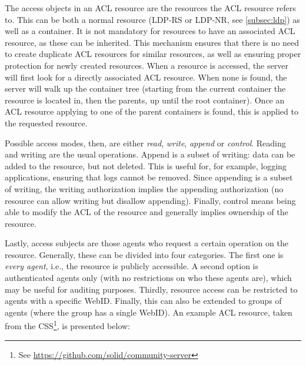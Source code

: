 The access objects in an \gls{ACL} resource are the resources the \gls{ACL} resource refers to. This can be both a normal resource (LDP-RS or LDP-NR, see \ref{subsec:ldp}) as well as a container. It is not mandatory for resources to have an associated \gls{ACL} resource, as these can be inherited. This mechanism ensures that there is no need to create duplicate \gls{ACL} resources for similar resources, as well as ensuring proper protection for newly created resources. When a resource is accessed, the server will first look for a directly associated \gls{ACL} resource. When none is found, the server will walk up the container tree (starting from the current container the resource is located in, then the parents, up until the root container). Once an \gls{ACL} resource applying to one of the parent containers is found, this is applied to the requested resource.

Possible access modes, then, are either \textit{read}, \textit{write}, \textit{append} or \textit{control}. Reading and writing are the usual operations. Append is a subset of writing: data can be added to the resource, but not deleted. This is useful for, for example, logging applications, ensuring that logs cannot be removed. Since appending is a subset of writing, the writing authorization implies the appending authorization (no resource can allow writing but disallow appending). Finally, control means being able to modify the \gls{ACL} of the resource and generally implies ownership of the resource.

Lastly, access subjects are those agents who request a certain operation on the resource. Generally, these can be divided into four categories. The first one is \textit{every agent}, i.e., the resource is publicly accessible. A second option is authenticated agents only (with no restrictions on who these agents are), which may be useful for auditing purposes. Thirdly, resource access can be restricted to agents with a specific WebID. Finally, this can also be extended to groups of agents (where the group has a single WebID). An example \gls{ACL} resource, taken from the \acrlong{CSS}\footnote{See \url{https://github.com/solid/community-server}}, is presented below:

{}

